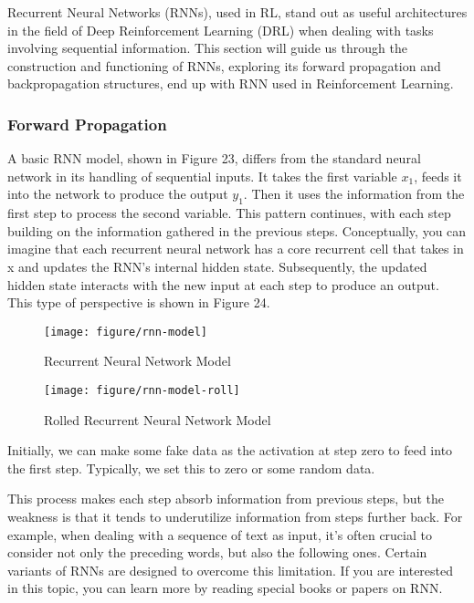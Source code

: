 \documentclass{article}
\begin{document}
Recurrent Neural Networks (RNNs), used in RL, stand out as useful architectures in the field of Deep Reinforcement Learning (DRL) when dealing with tasks involving sequential information. This section will guide us through the construction and functioning of RNNs, exploring its forward propagation and backpropagation structures, end up with RNN used in Reinforcement Learning.

\newpage
\subsubsection{Forward Propagation}

A basic RNN model, shown in Figure 23, differs from the standard neural network in its handling of sequential inputs. It takes the first variable $x_1$, feeds it into the network to produce the output $y_1$. Then it uses the information from the first step to process the second variable. This pattern continues, with each step building on the information gathered in the previous steps. Conceptually, you can imagine that each recurrent neural network has a core recurrent cell that takes in x and updates the RNN's internal hidden state. Subsequently, the updated hidden state interacts with the new input at each step to produce an output. This type of perspective is shown in Figure 24.


\begin{figure}[htbp]
        \centering
        \texttt{[image: figure/rnn-model]}
        \caption{Recurrent Neural Network Model}
     \end{figure}


\begin{figure}[htbp]
        \centering
        \texttt{[image: figure/rnn-model-roll]}
        \caption{Rolled Recurrent Neural Network Model}
     \end{figure}

Initially, we can make some fake data as the activation at step zero to feed into the first step. Typically, we set this to zero or some random data.

This process makes each step absorb information from previous steps, but the weakness is that it tends to underutilize information from steps further back. For example, when dealing with a sequence of text as input, it's often crucial to consider not only the preceding words, but also the following ones. Certain variants of RNNs are designed to overcome this limitation. If you are interested in this topic, you can learn more by reading special books or papers on RNN.
\end{document}
